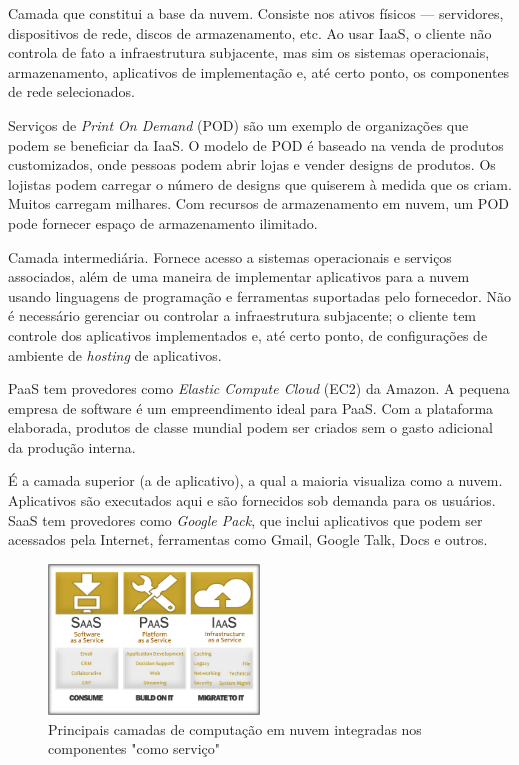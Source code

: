 \begin{itemise}

     Camada que constitui a base da nuvem.
    Consiste nos ativos físicos --- servidores, dispositivos de rede, discos de armazenamento,
    etc. Ao usar IaaS, o cliente não controla de fato a infraestrutura subjacente, mas sim
    os sistemas operacionais, armazenamento, aplicativos de implementação e, até certo ponto,
    os componentes de rede selecionados. 

    Serviços de \emph{Print On Demand} (POD) são um exemplo de organizações que podem se
    beneficiar da IaaS. O modelo de POD é baseado na venda de produtos customizados, onde
    pessoas podem abrir lojas e vender designs de produtos. Os lojistas podem carregar
    o número de designs que quiserem à medida que os criam. Muitos carregam milhares.
    Com recursos de armazenamento em nuvem, um POD pode fornecer espaço de armazenamento
    ilimitado.

     Camada intermediária. Fornece acesso a
    sistemas operacionais e serviços associados, além de uma maneira de implementar
    aplicativos para a nuvem usando linguagens de programação e ferramentas suportadas
    pelo fornecedor. Não é necessário gerenciar ou controlar a infraestrutura subjacente;
    o cliente tem controle dos aplicativos implementados e, até certo ponto, de configurações
    de ambiente de \emph{hosting} de aplicativos. 

    PaaS tem provedores como \emph{Elastic Compute Cloud} (EC2) da Amazon. A pequena 
empresa de software é um empreendimento ideal para PaaS. Com a plataforma elaborada,
produtos de classe mundial podem ser criados sem o gasto adicional da produção
interna.

     É a camada superior (a de aplicativo), a qual
    a maioria visualiza como a nuvem. Aplicativos são executados aqui e são fornecidos
    sob demanda para os usuários. SaaS tem provedores como \emph{Google Pack}, que
    inclui aplicativos que podem ser acessados pela Internet, ferramentas como Gmail,
    Google Talk, Docs e outros.

\end{itemise}

\begin{figure}[H]
    \centering
    \includegraphics[width=0.5\textwidth]{img/services2.png}
    \caption{Principais camadas de computação em nuvem integradas nos componentes
        "como serviço"~\cite{cloud-computing-fundamentals}
    }
    \label{fig:layers}
\end{figure}


